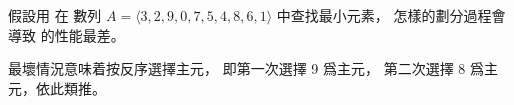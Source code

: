 \startEXERCISE
假設用  在
數列 $A=\langle 3,2,9,0,7,5,4,8,6,1\rangle$ 中查找最小元素，
怎樣的劃分過程會導致  的性能最差。
\stopEXERCISE

\startANSWER
最壞情況意味着按反序選擇主元，
即第一次選擇 9 爲主元，
第二次選擇 8 爲主元，依此類推。
\stopANSWER
